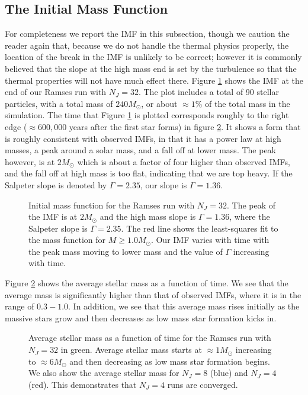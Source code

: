 \documentclass[../dissertation.tex]{subfiles}
\begin{document}
\subsection{The Initial Mass Function}

For completeness we report the IMF in this subsection, though we caution the reader again that, because we do not handle the thermal physics properly, the location of the break in the IMF is unlikely to be correct; however it is commonly believed that the slope at the high mass end is set by the turbulence so that the thermal properties will not have much effect there.
Figure \ref{fig:hydro_imf} shows the IMF at the end of our Ramses run with $N_J = 32$. 
The plot includes a total of 90 stellar particles, with a total mass of $240 M_\odot$, or about  $\approx 1 \%$ of the total mass in the simulation. The time that Figure \ref{fig:hydro_imf} is plotted corresponds roughly to the right edge ($\approx 600,000$ years after the first star forms) in figure \ref{fig:hydro_avg_mass}. 
It shows a form that is roughly consistent with observed IMFs, in that it has a power law at high masses, a peak around a solar mass, and a fall off at lower mass. The peak however, is at $2 M_\odot$ which is about a factor of four higher than observed IMFs, and the fall off at high mass is too flat, indicating that we are top heavy. If the Salpeter slope is denoted by $\Gamma = 2.35$, our slope is $\Gamma = 1.36$. 

\begin{figure}[htb]
\caption[Hydro Initial Mass Function]{Initial mass function for the Ramses run with $N_J = 32$. The peak of the IMF is at $2 M_\odot$ and the high mass slope is $\Gamma = 1.36$, where the Salpeter slope is $\Gamma = 2.35$. The red line shows the least-squares fit to the mass function for $M \geq 1.0 M_\odot$. Our IMF varies with time with the peak mass moving to lower mass and the value of $\Gamma$ increasing with time. \label{fig:hydro_imf}}
\end{figure}

Figure \ref{fig:hydro_avg_mass} shows the average stellar mass as a function of time. We see that the average mass is significantly higher than that of observed IMFs, where it is in the range of $0.3 - 1.0$. In addition, we see that this average mass rises initially as the massive stars grow and then decreases as low mass star formation kicks in.

\begin{figure}[htb]
\caption[Hydro Average Stellar Mass as a function of time since the first star formed]{Average stellar mass as a function of time for the Ramses run with $N_J = 32$ in green. Average stellar mass starts at $\approx 1 M_\odot$ increasing to $\approx 6 M_\odot$ and then decreasing as low mass star formation begins. We also show the average stellar mass for $N_J = 8$ (blue) and $N_J = 4$ (red). This demonstrates that $N_J = 4$ runs are converged. \label{fig:hydro_avg_mass}}
\end{figure}
\end{document}
